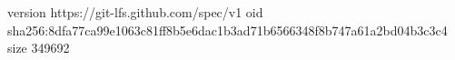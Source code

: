version https://git-lfs.github.com/spec/v1
oid sha256:8dfa77ca99e1063c81ff8b5e6dac1b3ad71b6566348f8b747a61a2bd04b3c3c4
size 349692
